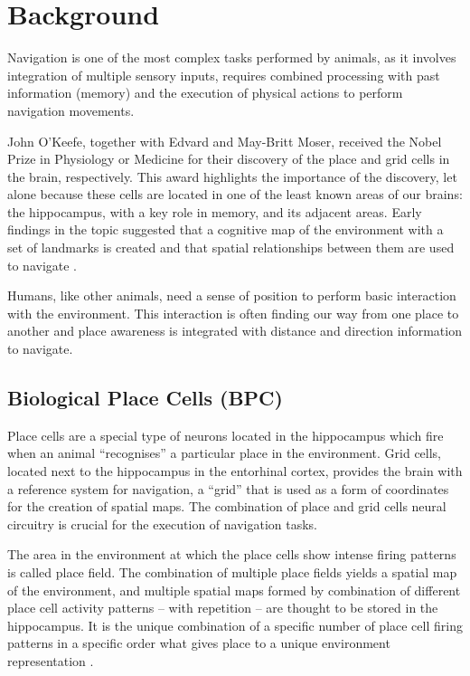 \section{Background}

Navigation is one of the most complex tasks performed by animals, as it involves integration of multiple sensory inputs, requires combined processing with past information (memory) and the execution of physical actions to perform navigation movements.

John O'Keefe, together with Edvard and May-Britt Moser, received the Nobel Prize in Physiology or Medicine for their discovery of the place and grid cells in the brain, respectively. This award highlights the importance of the discovery, let alone because these cells are located in one of the least known areas of our brains: the hippocampus, with a key role in memory, and its adjacent areas. Early findings in the topic suggested that a cognitive map of the environment with a set of landmarks is created and that spatial relationships between them are used to navigate \cite{keefe1978hippocampus}.

Humans, like other animals, need a sense of position to perform basic interaction with the environment. This interaction is often finding our way from one place to another and place awareness is integrated with distance and direction information to navigate. 


\subsection{Biological Place Cells (BPC)}


Place cells are a special type of neurons located in the hippocampus which fire when an animal ``recognises'' a particular place in the environment. Grid cells, located next to the hippocampus in the entorhinal cortex, provides the brain with a reference system for navigation, a ``grid'' that is used as a form of coordinates for the creation of spatial maps. The combination of place and grid cells neural circuitry is crucial for the execution of navigation tasks.

The area in the environment at which the place cells show intense firing patterns is called place field. The combination of multiple place fields yields a spatial map of the environment, and multiple spatial maps formed by combination of different place cell activity patterns -- with repetition -- are thought to be stored in the hippocampus. It is the unique combination of a specific number of place cell firing patterns in a specific order what gives place to a unique environment representation \cite{okeefe1971hippocampus}.

